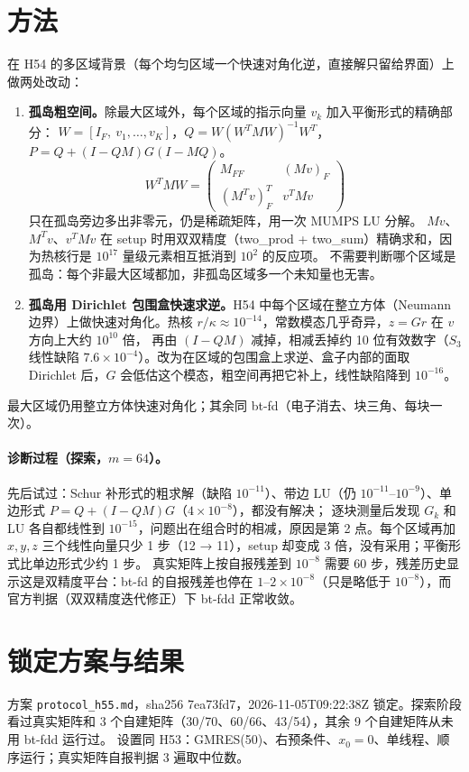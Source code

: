 \documentclass[11pt,a4paper]{ctexart}
\begin{document}
\section{方法}
\sloppy 在 H54 的多区域背景（每个均匀区域一个快速对角化逆，直接解只留给界面）上做两处改动：
\begin{enumerate}
\item \textbf{孤岛粗空间。}除最大区域外，每个区域的指示向量 $v_k$ 加入平衡形式的精确部分：
$W=[I_F,\ v_1,\dots,v_K]$，$Q=W(W^TMW)^{-1}W^T$，$P=Q+(I-QM)G(I-MQ)$。
\[W^TMW=\begin{pmatrix}M_{FF}&(Mv)_F\\ (M^Tv)_F^T& v^TMv\end{pmatrix}\]
只在孤岛旁边多出非零元，仍是稀疏矩阵，用一次 MUMPS LU 分解。
$Mv$、$M^Tv$、$v^TMv$ 在 setup 时用双双精度（two\_prod + two\_sum）精确求和，因为热核行是 $10^{17}$ 量级元素相互抵消到 $10^2$ 的反应项。
不需要判断哪个区域是孤岛：每个非最大区域都加，非孤岛区域多一个未知量也无害。
\item \textbf{孤岛用 Dirichlet 包围盒快速求逆。}H54 中每个区域在整立方体（Neumann 边界）上做快速对角化。热核 $r/\kappa\approx10^{-14}$，常数模态几乎奇异，$z=Gr$ 在 $v$ 方向上大约 $10^{10}$ 倍，
再由 $(I-QM)$ 减掉，相减丢掉约 10 位有效数字（$S_3$ 线性缺陷 $7.6\times10^{-4}$）。改为在区域的包围盒上求逆、盒子内部的面取 Dirichlet 后，$G$ 会低估这个模态，粗空间再把它补上，线性缺陷降到 $10^{-16}$。
\end{enumerate}
最大区域仍用整立方体快速对角化；其余同 bt-fd（电子消去、块三角、每块一次）。

\paragraph{诊断过程（探索，$m=64$）。}先后试过：Schur 补形式的粗求解（缺陷 $10^{-11}$）、带边 LU（仍 $10^{-11}$--$10^{-9}$）、单边形式 $P=Q+(I-QM)G$（$4\times10^{-8}$），都没有解决；
逐块测量后发现 $G_k$ 和 LU 各自都线性到 $10^{-15}$，问题出在组合时的相减，原因是第 2 点。每个区域再加 $x,y,z$ 三个线性向量只少 1 步（12 → 11），setup 却变成 3 倍，没有采用；平衡形式比单边形式少约 1 步。
真实矩阵上按自报残差到 $10^{-8}$ 需要 60 步，残差历史显示这是双精度平台：bt-fd 的自报残差也停在 $1$--$2\times10^{-8}$（只是略低于 $10^{-8}$），而官方判据（双双精度迭代修正）下 bt-fdd 正常收敛。

\section{锁定方案与结果}
\sloppy 方案 \texttt{protocol\_h55.md}，sha256 7ea73fd7，2026-11-05T09:22:38Z 锁定。探索阶段看过真实矩阵和 3 个自建矩阵（30/70、60/66、43/54），其余 9 个自建矩阵从未用 bt-fdd 运行过。
设置同 H53：GMRES(50)、右预条件、$x_0=0$、单线程、顺序运行；真实矩阵自报判据 3 遍取中位数。
\end{document}
